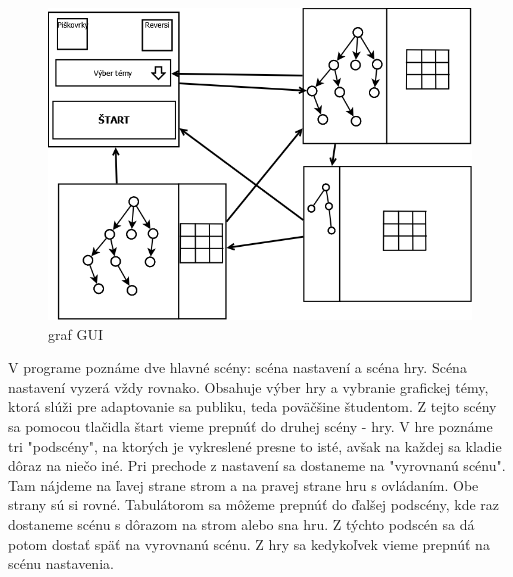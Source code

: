 \documentclass{article}
\begin{document}
\begin{figure}[H]
		\centering
		\includegraphics[width=\textwidth]{images/gui_graph-diagram.png}
		\caption{graf GUI}
		\label{fig:guigraph}
\end{figure}
V programe poznáme dve hlavné scény: scéna nastavení a scéna hry. Scéna nastavení vyzerá vždy rovnako. Obsahuje výber hry a vybranie grafickej témy, ktorá slúži pre adaptovanie sa publiku, teda poväčšine študentom. Z tejto scény sa pomocou tlačidla štart vieme prepnúť do druhej scény - hry. V hre poznáme tri "podscény", na ktorých je vykreslené presne to isté, avšak na každej sa kladie dôraz na niečo iné. Pri prechode z nastavení sa dostaneme na "vyrovnanú scénu". Tam nájdeme na ľavej strane strom a na pravej strane hru s ovládaním. Obe strany sú si rovné. Tabulátorom sa môžeme prepnúť do ďalšej podscény, kde raz dostaneme scénu s dôrazom na strom alebo sna hru. Z týchto podscén sa dá potom dostať späť na vyrovnanú scénu. Z hry sa kedykoľvek vieme prepnúť na scénu nastavenia.
\end{document}
